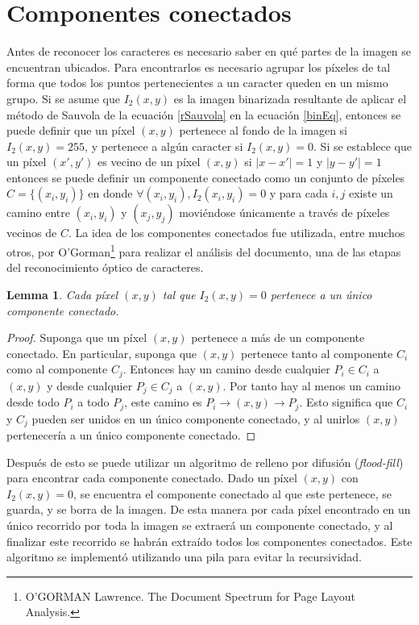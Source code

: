 \documentclass[a4paper, 11pt, oneside]{report}
\begin{document}
\section{Componentes conectados}
\label{sect:conComponents}

Antes de reconocer los caracteres es necesario saber en qué partes de la imagen se encuentran ubicados. Para encontrarlos es necesario agrupar los píxeles de tal forma que todos los puntos pertenecientes a un caracter queden en un mismo grupo. Si se asume que $I_2(x,y)$ es la imagen binarizada resultante de aplicar el método de Sauvola de la ecuación \eqref{rSauvola} en la ecuación \eqref{binEq}, entonces se puede definir que un píxel $(x,y)$ pertenece al fondo de la imagen si $I_2(x,y)=255$, y pertenece a algún caracter si $I_2(x,y)=0$. Si se establece que un píxel $(x',y')$ es vecino de un píxel $(x,y)$ si $|x-x'|=1$ y $|y-y'|=1$ entonces se puede definir un componente conectado como un conjunto de píxeles $C=\{(x_i,y_i)\}$ en donde $\forall{(x_i,y_i)}, I_2(x_i,y_i)=0$ y para cada $i,j$ existe un camino entre $(x_i,y_i)$ y $(x_j,y_j)$ moviéndose únicamente a través de píxeles vecinos de $C$. La idea de los componentes conectados fue utilizada, entre muchos otros, por O'Gorman\footnote{O’GORMAN Lawrence. The Document Spectrum for Page Layout Analysis.} para realizar el análisis del documento, una de las etapas del reconocimiento óptico de caracteres.

\newtheorem{pixHasOneC}{Lemma}
\begin{pixHasOneC}
	Cada píxel $(x,y)$ tal que $I_2(x,y)=0$ pertenece a un único componente conectado.
\end{pixHasOneC}
\begin{proof}
	Suponga que un píxel $(x,y)$ pertenece a más de un componente conectado. En particular, suponga que $(x,y)$ pertenece tanto al componente $C_i$ como al componente $C_j$. Entonces hay un camino desde cualquier $P_i \in C_i$ a $(x,y)$ y desde cualquier $P_j \in C_j$ a $(x,y)$. Por tanto hay al menos un camino desde todo $P_i$ a todo $P_j$, este camino es $P_i \rightarrow (x,y) \rightarrow P_j$. Esto significa que $C_i$ y $C_j$ pueden ser unidos en un único componente conectado, y al unirlos $(x,y)$ pertenecería a un único componente conectado.
\end{proof}

Después de esto se puede utilizar un algoritmo de relleno por difusión ({\em flood-fill}) para encontrar cada componente conectado. Dado un píxel $(x,y)$ con $I_2(x,y)=0$, se encuentra el componente conectado al que este pertenece, se guarda, y se borra de la imagen. De esta manera por cada píxel encontrado en un único recorrido por toda la imagen se extraerá un componente conectado, y al finalizar este recorrido se habrán extraído todos los componentes conectados. Este algoritmo se implementó utilizando una pila para evitar la recursividad.
\end{document}
